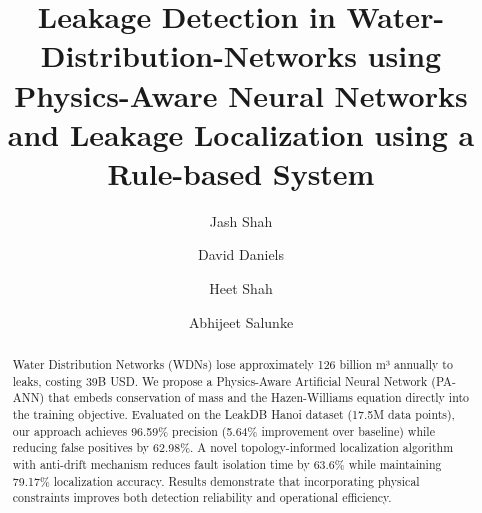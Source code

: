 \documentclass[final,5p,times,twocolumn,authoryear]{elsarticle}
\begin{document}
\begin{frontmatter}



\title{Leakage Detection in Water-Distribution-Networks using Physics-Aware Neural Networks and Leakage Localization using a Rule-based System}



\author[inst1,eq]{Jash Shah}
\author[inst1,eq]{David Daniels}
\author[inst1,eq]{Heet Shah}
\author[inst1,eq]{Abhijeet Salunke}

\vspace{0.3cm}



\begin{abstract}
Water Distribution Networks (WDNs) lose approximately 126 billion m³ annually to leaks,
costing 39B USD. We propose a Physics-Aware Artificial Neural Network (PA-ANN) that
embeds conservation of mass and the Hazen-Williams equation directly into the training
objective. Evaluated on the LeakDB Hanoi dataset (17.5M data points), our approach
achieves 96.59\% precision (5.64\% improvement over baseline) while reducing false
positives by 62.98\%. A novel topology-informed localization algorithm with anti-drift
mechanism reduces fault isolation time by 63.6\% while maintaining 79.17\% localization
accuracy. Results demonstrate that incorporating physical constraints improves both
detection reliability and operational efficiency.
\end{abstract}


\end{frontmatter}
\end{document}
